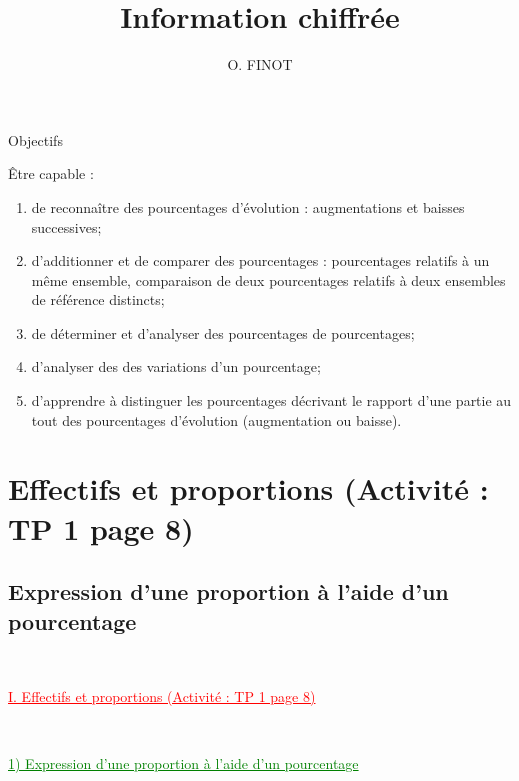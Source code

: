 \documentclass[xcolor={dvipsnames}]{beamer}
\title{Information chiffrée}
\author{O. FINOT}\institute{Lycée S$^t$ Vincent}
\begin{document}
\begin{frame}
  \titlepage 
\end{frame}


	

\begin{frame}{Objectifs}

\begin{block}{Être capable :}
	
	\begin{enumerate}
		\item de reconnaître des pourcentages d'évolution : augmentations et baisses successives;
		\item d'additionner et de comparer des pourcentages : pourcentages relatifs à un même ensemble, comparaison de deux pourcentages relatifs à deux ensembles de référence distincts;
		\item de déterminer et d'analyser des pourcentages de pourcentages;
		\item d'analyser des des variations d'un pourcentage;
		\item d'apprendre à distinguer les pourcentages décrivant le rapport d'une partie au tout des pourcentages d'évolution (augmentation ou baisse).
	\end{enumerate}
\end{block}
\end{frame}

\section{Effectifs et proportions (Activité : TP 1 page 8)}



\subsection{Expression d'une proportion à l'aide d'un pourcentage}


\begin{frame}
\

\begin{Large}
	\textcolor{Red}{\underline{I. Effectifs et proportions (Activité : TP 1 page 8)}}
\end{Large}\pause
\

\vspace*{1cm}

\textcolor{Green}{\underline{1) Expression d'une proportion à l'aide d'un pourcentage}}
\end{frame}
\end{document}
